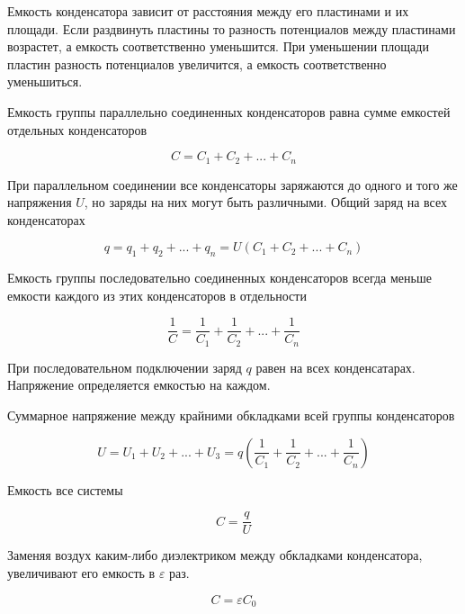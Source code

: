 \documentclass[a4paper,12pt]{article}
\begin{document}
		Емкость конденсатора зависит от расстояния между его пластинами и их площади.
		Если раздвинуть пластины то разность потенциалов между пластинами возрастет, а
		емкость соответственно уменьшится. При уменьшении площади пластин разность
		потенциалов увеличится, а емкость соответственно уменьшиться.

		Емкость группы параллельно соединенных конденсаторов равна сумме емкостей
		отдельных конденсаторов

		\begin{equation*}
			C = C_1 + C_2 + ... + C_n
		\end{equation*}

		При параллельном соединении все конденсаторы заряжаются до одного и того же 
		напряжения $U$, но заряды на них могут быть различными. Общий заряд на всех 
		конденсаторах

		\begin{equation*}
			q = q_1 + q_2 + ... + q_n = U(C_1 + C_2 + ... + C_n)
		\end{equation*}

		Емкость группы последовательно соединенных конденсаторов всегда меньше емкости
		каждого из этих конденсаторов в отдельности

		\begin{equation*}
			\frac{1}{C} = \frac{1}{C_1} + \frac{1}{C_2} + ... + \frac{1}{C_n}
		\end{equation*}

		При последовательном подключении заряд $q$ равен на всех конденсатарах. Напряжение
		определяется емкостью на каждом.

		Суммарное напряжение между крайними обкладками всей группы конденсаторов

		\begin{equation*}
			U = U_1 + U_2 + ... + U_3 = q \left(\frac{1}{C_1} + \frac{1}{C_2} + ... + \frac{1}{C_n}\right)
		\end{equation*}

		Емкость все системы

		\begin{equation*}
			C = \frac{q}{U}
		\end{equation*}

		Заменяя воздух каким-либо диэлектриком между обкладками конденсатора,
		увеличивают его емкость в $\varepsilon$ раз.
		
		\begin{equation}
			C = \varepsilon C_0
		\end{equation}
\end{document}
